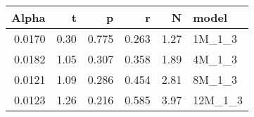 \begin{table}[ht]
\centering
\begin{tabular}{rrrrrl}
  \hline
Alpha & t & p & r & N & model \\ 
  \hline
0.0170 & 0.30 & 0.775 & 0.263 & 1.27 & 1M\_1\_3 \\ 
  0.0182 & 1.05 & 0.307 & 0.358 & 1.89 & 4M\_1\_3 \\ 
  0.0121 & 1.09 & 0.286 & 0.454 & 2.81 & 8M\_1\_3 \\ 
  0.0123 & 1.26 & 0.216 & 0.585 & 3.97 & 12M\_1\_3 \\ 
   \hline
\end{tabular}
\end{table}


